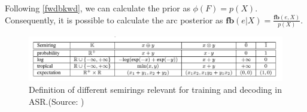 \documentclass[a4paper,13.5pt]{extarticle}
\begin{document}
	Following \cref{fwdbkwd}, we can calculate the prior as $\phi(F) = p(X)$. Consequently, it is possible to calculate the arc posterior as $\mathbf{fb}(e | X) = \frac{	\mathbf{fb}(e, X)}{ p(X)}$.
	
	
	\begin{figure}[t]
		\centering
		\caption*{Definition of different semirings relevant for training and decoding in ASR.(Source: \cite{hoffmeister2011wfst})}
		\includegraphics[width=1.\linewidth]{figures/semirings}	
	\end{figure}
	
	
	
	
	
	
	
	
	
	
	
	
	
	
	
\end{document}
